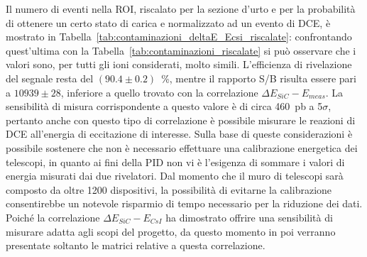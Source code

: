 Il numero di eventi nella ROI, riscalato per la sezione d'urto e per la probabilità di ottenere un certo stato di carica e normalizzato ad un evento di DCE, è mostrato in Tabella~\ref{tab:contaminazioni_deltaE_Ecsi_riscalate}: confrontando quest'ultima con la Tabella~\ref{tab:contaminazioni_riscalate} si può osservare che i valori sono, per tutti gli ioni considerati, molto simili.
L'efficienza di rivelazione del segnale resta del $(90.4 \pm 0.2)$~\%, mentre il rapporto S/B risulta essere pari a $10939 \pm 28 $, inferiore a quello trovato con la correlazione $\Delta E_{SiC} - E_{meas}$.
La sensibilità di misura corrispondente a questo valore è di circa 460~pb a 5$\sigma$, pertanto anche con questo tipo di correlazione è possibile misurare le reazioni di DCE all'energia di eccitazione di interesse.
Sulla base di queste considerazioni è possibile sostenere che non è necessario effettuare una calibrazione energetica dei telescopi, in quanto ai fini della PID non vi è l'esigenza di sommare i valori di energia misurati dai due rivelatori. 
Dal momento che il muro di telescopi sarà composto da oltre 1200 dispositivi, la possibilità di evitarne la calibrazione consentirebbe un notevole risparmio di tempo necessario per la riduzione dei dati.
Poiché la correlazione $\Delta E_{SiC} - E_{CsI}$ ha dimostrato offrire una sensibilità di misurare adatta agli scopi del progetto, da questo momento in poi verranno presentate soltanto le matrici relative a questa correlazione.









